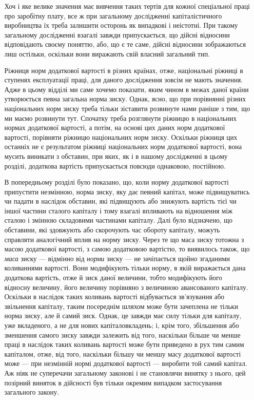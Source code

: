 \parcont{}  %
Хоч і яке велике значення має вивчення таких тертів для кожної
спеціальної праці про заробітну плату, все ж при загальному
дослідженні капіталістичного виробництва їх треба залишити
осторонь як випадкові і неістотні. При такому загальному
дослідженні взагалі завжди припускається, що дійсні відносини
відповідають своєму поняттю, або, що є те саме, дійсні відносини
зображаються лиш остільки, оскільки вони виражають свій
власний загальний тип.

Ріжниця норм додаткової вартості в різних країнах, отже,
національні ріжниці в ступенях експлуатації праці, для даного
дослідження зовсім не мають значення. Адже в цьому відділі ми
саме хочемо показати, яким чином в межах даної країни утворюється
певна загальна норма зиску. Однак, ясно, що при порівнянні
різних національних норм зиску треба тільки зіставити розвинуте
нами раніше з тим, що ми маємо розвинути тут. Спочатку
треба розглянути ріжницю в національних нормах додаткової
вартості, а потім, на основі цих даних норм додаткової вартості,
порівняти ріжницю національних норм зиску. Оскільки ріжниця
цих останніх не є результатом ріжниці національних норм додаткової
вартості, вона мусить виникати з обставин, при яких,
як і в нашому дослідженні в цьому розділі, додаткова вартість
припускається повсюди однаковою, постійною.

В попередньому розділі було показано, що, коли норму додаткової
вартості припустити незмінною, норма зиску, яку дає певний
капітал, може підвищуватись чи падати в наслідок обставин,
які підвищують або знижують вартість тієї чи іншої частини
сталого капіталу і тому взагалі впливають на відношення між
сталою і змінною складовими частинами капіталу. Далі було
відзначено, що обставини, які здовжують або скорочують час
обороту капіталу, можуть справляти аналогічний вплив на
норму зиску. Через те що маса зиску тотожна з масою додаткової
вартості, з самою додатковою вартістю, то виявилось також,
що \emph{маса} зиску — відмінно від \emph{норми} зиску — не зачіпається
щойно згаданими коливаннями вартості. Вони модифікують тільки
норму, в якій виражається дана додаткова вартість, отже й зиск
даної величини, тобто модифікують його відносну величину,
його величину порівняно з величиною авансованого капіталу.
Оскільки в наслідок таких коливань вартості відбувається зв’язування
або звільнення капіталу, таким посереднім шляхом може
бути зачеплена не тільки норма зиску, але й самий зиск. Однак,
це завжди має силу тільки для капіталу, уже вкладеного, а не
для нових капіталовкладень; і, крім того, збільшення або зменшення
самого зиску завжди залежить від того, наскільки більше
чи менше праці в наслідок таких коливань вартості може бути
приведено в рух тим самим капіталом, отже, від того, наскільки
більшу чи меншу масу додаткової вартості може — при незмінній
нормі додаткової вартості — виробити той самий капітал.
Аж ніяк не суперечачи загальному законові і не становлячи винятку
з нього, цей позірний виняток в дійсності був тільки
окремим випадком застосування загального закону.

